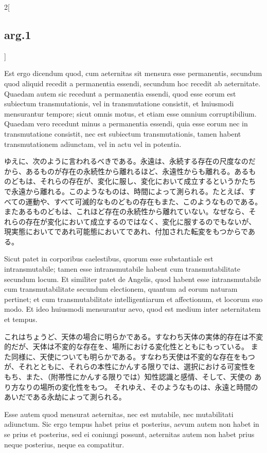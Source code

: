 \documentclass[paper=a4paper,fontsize=10pt,jafontsize=9pt,titlepage]{jlreq}
\begin{document}
\begin{paracol}{2}[\subsection{arg.1}]
\switchcolumn*

Est
ergo dicendum quod, cum aeternitas sit mensura esse permanentis,
secundum quod aliquid recedit a permanentia essendi, secundum hoc
recedit ab aeternitate. Quaedam autem sic recedunt a permanentia
essendi, quod esse eorum est subiectum transmutationis, vel in
transmutatione consistit, et huiusmodi mensurantur tempore; sicut omnis
motus, et etiam esse omnium corruptibilium. Quaedam vero recedunt minus
a permanentia essendi, quia esse eorum nec in transmutatione consistit,
nec est subiectum transmutationis, tamen habent transmutationem
adiunctam, vel in actu vel in potentia.

\switchcolumn

ゆえに、次のように言われるべきである。永遠は、永続する存在の尺度なのだ
から、あるものが存在の永続性から離れるほど、永遠性からも離れる。あるも
のどもは、それらの存在が、変化に服し、変化において成立するというかたち
で永遠から離れる。このようなものは、時間によって測られる。たとえば、す
べての運動や、すべて可滅的なものどもの存在もまた、このようなものである。
またあるものどもは、これほど存在の永続性から離れていない。なぜなら、そ
れらの存在が変化において成立するのではなく、変化に服するのでもないが、
現実態においてであれ可能態においてであれ、付加された転変をもつからであ
る。

\switchcolumn*

Sicut patet in corporibus
caelestibus, quorum esse substantiale est intransmutabile; tamen esse
intransmutabile habent cum transmutabilitate secundum locum. Et
similiter patet de Angelis, quod habent esse intransmutabile cum
transmutabilitate secundum electionem, quantum ad eorum naturam
pertinet; et cum transmutabilitate intelligentiarum et affectionum, et
locorum suo modo. Et ideo huiusmodi mensurantur aevo, quod est medium
inter aeternitatem et tempus.

\switchcolumn

これはちょうど、天体の場合に明らかである。すなわち天体の実体的存在は不変
 的だが、天体は不変的な存在を、場所における変化性とともにもっている。
また同様に、天使についても明らかである。すなわち天使は不変的な存在をもつ
 が、それとともに、それらの本性にかんする限りでは、選択における可変性を
 もち、また、（附帯性にかんする限りでは）知性認識と感情、そして、天使の
 あり方なりの場所の変化性をもつ。
それゆえ、そのようなものは、永遠と時間のあいだである永劫によって測られる。

\switchcolumn*

Esse autem quod mensurat aeternitas, nec
est mutabile, nec mutabilitati adiunctum. Sic ergo tempus habet prius et
posterius, aevum autem non habet in se prius et posterius, sed ei
coniungi possunt, aeternitas autem non habet prius neque posterius,
neque ea compatitur.


\end{paracol}
\end{document}
